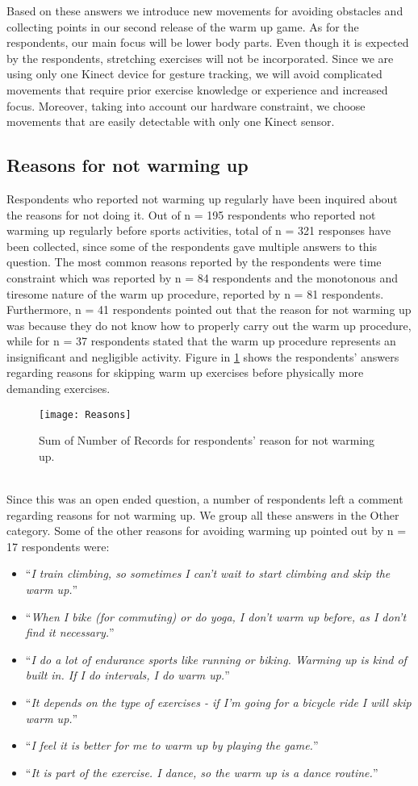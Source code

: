 Based on these answers we introduce new movements for avoiding obstacles and collecting points in our second release of the warm up game. As for the respondents, our main focus will be lower body parts. Even though it is expected by the respondents, stretching exercises will not be incorporated. Since we are using only one Kinect device for gesture tracking, we will avoid complicated movements that require prior exercise knowledge or experience and increased focus. Moreover, taking into account our hardware constraint, we choose movements that are easily detectable with only one Kinect sensor. 
\subsection{Reasons for not warming up}
Respondents who reported not warming up regularly have been inquired about the reasons for not doing it.  Out of n = 195 respondents who reported not warming up regularly before sports activities, total of n = 321 responses have been collected, since some of the respondents gave multiple answers to this question. The most common reasons reported by the respondents were time constraint which was reported by n = 84 respondents and the monotonous and tiresome nature of the warm up procedure, reported by n = 81 respondents. Furthermore, n = 41 respondents pointed out that the reason for not warming up was because they do not know how to properly carry out the warm up procedure, while for n = 37 respondents stated that the warm up procedure represents an insignificant and negligible activity. Figure in \ref{fig:Reasons} shows the respondents' answers regarding reasons for skipping warm up exercises before physically more demanding exercises.
\begin{figure}[h]
    \centering
    \texttt{[image: Reasons]}
    \caption{Sum of Number of Records for respondents' reason for not warming up.}
    \label{fig:Reasons}
\end{figure}\\
Since this was an open ended question, a number of respondents left a comment regarding reasons for not warming up. We group all these answers in the Other category. Some of the other reasons for avoiding warming up pointed out by n = 17 respondents were: 
\begin{itemize}
\item ``\textit{I train climbing, so sometimes I can't wait to start climbing and skip the warm up.}''
 \item ``\textit{When I bike (for commuting) or do yoga, I don't warm up before, as I don't find it necessary.}''
\item ``\textit{I do a lot of endurance sports like running or biking. Warming up is kind of built in. If I do intervals, I do warm up.}''
\item ``\textit{It depends on the type of exercises - if I'm going for a bicycle ride I will skip warm up.}''
\item ``\textit{I feel it is better for me to warm up by playing the game.}''
\item ``\textit{It is part of the exercise. I dance, so the warm up is a dance routine.}''
\end{itemize}
